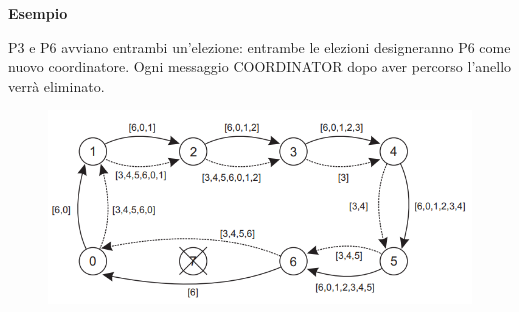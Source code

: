 \documentclass{article}
\begin{document}
\vspace{3mm}
\textbf{Esempio}

P3 e P6 avviano entrambi un'elezione: entrambe le elezioni designeranno P6 come nuovo coordinatore. Ogni messaggio COORDINATOR dopo aver percorso l'anello verrà eliminato.

\begin{figure}[htbp]
    \centering
    \includegraphics[width=0.90\columnwidth]{imgs/anello_es.PNG}
\end{figure}
\end{document}
